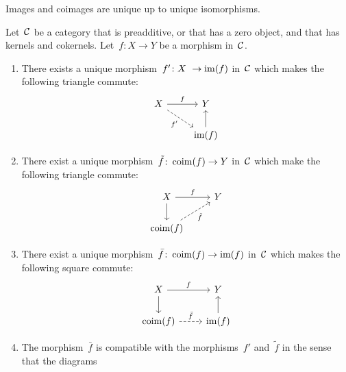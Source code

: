 \begin{remark*}
  Images and coimages are unique up to unique isomorphisms.
\end{remark*}


\begin{lemma}
  \label{canonical factorization}
  Let~$\mathcal{C}$ be a category that is preadditive, or that has a zero object, and that has kernels and cokernels.
  Let~$f \colon X \to Y$ be a morphism in~$\mathcal{C}$.
  \begin{enumerate}
    \item
      \label{restriction to image}
      There exists a unique morphism~$f' \colon X \to \im(f)$ in~$\mathcal{C}$ which makes the following triangle commute:
      \[
        \begin{tikzcd}
            X
            \arrow{r}[above]{f}
            \arrow[dashed]{dr}[below left]{f'}
          & Y
          \\
            {}
          & \im(f)
            \arrow{u}
        \end{tikzcd}
      \]
    \item
      There exist a unique morphism~$\tilde{f} \colon \operatorname{coim}(f) \to Y$ in~$\mathcal{C}$ which make the following triangle commute:
      \[
        \begin{tikzcd}
            X
            \arrow{r}[above]{f}
            \arrow{d}
          & Y
          \\
            \coim(f)
            \arrow[dashed]{ur}[below right]{\tilde{f}}
          & {}
        \end{tikzcd}
      \]
    \item
      There exist a unique morphism~$\bar{f} \colon \operatorname{coim}(f) \to \operatorname{im}(f)$ in~$\mathcal{C}$ which makes the following square commute:
      \begin{equation}
        \label{canonical morphism from coim to im}
        \begin{tikzcd}
            X
            \arrow{r}[above]{f}
            \arrow{d}
          & Y
          \\
            \coim(f)
            \arrow[dashed]{r}[above]{\bar{f}}
          & \im(f)
            \arrow{u}
        \end{tikzcd}
      \end{equation}
    \item
      The morphism~$\bar{f}$ is compatible with the morphisms~$f'$ and~$\tilde{f}$ in the sense that the diagrams
      \begin{equation}

\end{equation}
\end{enumerate}
\end{lemma}
